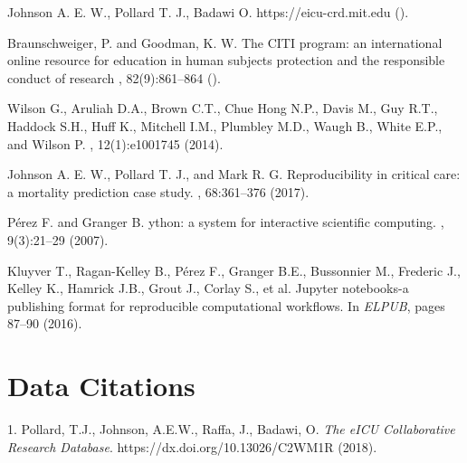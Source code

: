 \documentclass[english]{article}
\begin{document}
\begin{thebibliography}{1}
Johnson A. E. W., Pollard T. J., Badawi O.
\newblock {}
\newblock https://eicu-crd.mit.edu
().

Braunschweiger, P. and Goodman, K. W.
\newblock The CITI program: an international online resource for education in human subjects protection and the responsible conduct of research
, 82(9):861--864 ().

Wilson G., Aruliah D.A., Brown C.T., Chue Hong N.P., Davis M., Guy R.T., Haddock S.H., Huff K., Mitchell I.M., Plumbley M.D., Waugh B., White E.P., and Wilson P.
, 12(1):e1001745 (2014).

Johnson A. E. W., Pollard T. J., and Mark R. G.
\newblock Reproducibility in critical care: a mortality prediction case study.
, 68:361--376 (2017).

P\'erez F. and Granger B.
ython: a system for interactive scientific computing.
, 9(3):21--29 (2007).

Kluyver T., Ragan-Kelley B., P{\'e}rez F., Granger B.E., Bussonnier M., Frederic J., Kelley K., Hamrick J.B., Grout J., Corlay S., et al.
\newblock Jupyter notebooks-a publishing format for reproducible computational
  workflows.
\newblock In {\em ELPUB}, pages 87--90 (2016).

\end{thebibliography}

\section*{Data Citations}

1. Pollard, T.J., Johnson, A.E.W., Raffa, J., Badawi, O. \emph{The eICU Collaborative Research Database}. https://dx.doi.org/10.13026/C2WM1R (2018).
\end{document}
